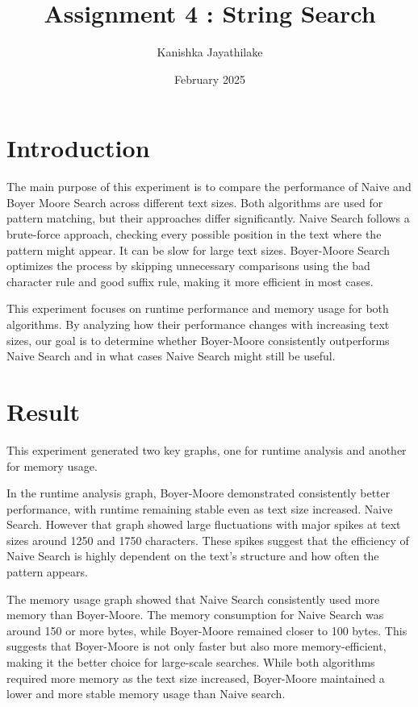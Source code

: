 \documentclass{article}
\title{Assignment 4 : String Search}
\author{Kanishka Jayathilake}
\date{February 2025}
\begin{document}
\maketitle

\section{Introduction}

The main purpose of this experiment is to compare the performance of Naive and Boyer Moore Search across different text sizes. Both algorithms are used for pattern matching, but their approaches differ significantly. Naive Search follows a brute-force approach, checking every possible position in the text where the pattern might appear. It can be slow for large text sizes. Boyer-Moore Search optimizes the process by skipping unnecessary comparisons using the bad character rule and good suffix rule, making it more efficient in most cases.

This experiment focuses on runtime performance and memory usage for both algorithms. By analyzing how their performance changes with increasing text sizes, our goal is to determine whether Boyer-Moore consistently outperforms Naive Search and in what cases Naive Search might still be useful.

\section{Result}

This experiment generated two key graphs, one for runtime analysis and another for memory usage.

In the runtime analysis graph, Boyer-Moore demonstrated consistently better performance, with runtime remaining stable even as text size increased. Naive Search. However that graph  showed large fluctuations with major spikes at text sizes around 1250 and 1750 characters. These spikes suggest that the efficiency of Naive Search is highly dependent on the text’s structure and how often the pattern appears. 

The memory usage graph showed that Naive Search consistently used more memory than Boyer-Moore. The memory consumption for Naive Search was around 150 or more bytes, while Boyer-Moore remained closer to 100 bytes. This suggests that Boyer-Moore is not only faster but also more memory-efficient, making it the better choice for large-scale searches. While both algorithms required more memory as the text size increased, Boyer-Moore maintained a lower and more stable memory usage than Naive search.
\end{document}
